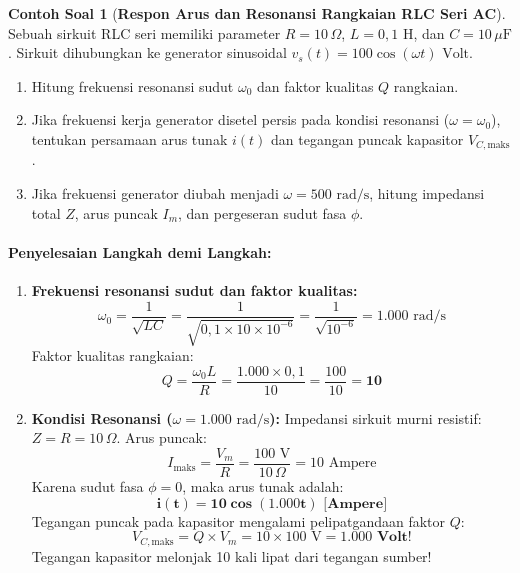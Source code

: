 \documentclass[11pt,a4paper]{article}
\theoremstyle{definition}
\newtheorem{example}{Contoh Soal}[section]
\begin{document}
\begin{example}[\textbf{Respon Arus dan Resonansi Rangkaian RLC Seri AC}]
Sebuah sirkuit RLC seri memiliki parameter $R = 10\,\Omega$, $L = 0{,}1\text{ H}$, dan $C = 10\,\mu\text{F}$. Sirkuit dihubungkan ke generator sinusoidal $v_s(t) = 100 \cos(\omega t)\text{ Volt}$.
\begin{enumerate}[label=(\alph*)]
    \item Hitung frekuensi resonansi sudut $\omega_0$ dan faktor kualitas $Q$ rangkaian.
    \item Jika frekuensi kerja generator disetel persis pada kondisi resonansi ($\omega = \omega_0$), tentukan persamaan arus tunak $i(t)$ dan tegangan puncak kapasitor $V_{C, \text{maks}}$.
    \item Jika frekuensi generator diubah menjadi $\omega = 500\text{ rad/s}$, hitung impedansi total $Z$, arus puncak $I_m$, dan pergeseran sudut fasa $\phi$.
\end{enumerate}

\paragraph{Penyelesaian Langkah demi Langkah:}
\begin{enumerate}[label=(\alph*), leftmargin=*]
    \item \textbf{Frekuensi resonansi sudut dan faktor kualitas:}
    \begin{equation*}
        \omega_0 = \frac{1}{\sqrt{LC}} = \frac{1}{\sqrt{0{,}1 \times 10 \times 10^{-6}}} = \frac{1}{\sqrt{10^{-6}}} = 1.000\text{ rad/s}
    \end{equation*}
    Faktor kualitas rangkaian:
    \begin{equation*}
        Q = \frac{\omega_0 L}{R} = \frac{1.000 \times 0{,}1}{10} = \frac{100}{10} = \mathbf{10}
    \end{equation*}

    \item \textbf{Kondisi Resonansi ($\omega = 1.000\text{ rad/s}$):}
    Impedansi sirkuit murni resistif: $Z = R = 10\,\Omega$.
    Arus puncak:
    \begin{equation*}
        I_{\text{maks}} = \frac{V_m}{R} = \frac{100\text{ V}}{10\,\Omega} = 10\text{ Ampere}
    \end{equation*}
    Karena sudut fasa $\phi = 0$, maka arus tunak adalah:
    \begin{equation*}
        \mathbf{i(t) = 10 \cos(1.000 t)\text{ [Ampere]}}
    \end{equation*}
    Tegangan puncak pada kapasitor mengalami pelipatgandaan faktor $Q$:
    \begin{equation*}
        V_{C, \text{maks}} = Q \times V_m = 10 \times 100\text{ V} = \mathbf{1.000\text{ Volt!}}
    \end{equation*}
    Tegangan kapasitor melonjak 10 kali lipat dari tegangan sumber!


\end{enumerate}
\end{example}
\end{document}

